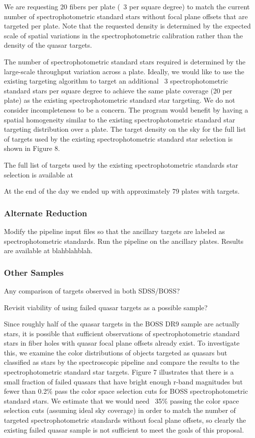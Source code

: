 \documentclass[preprint2]{aastex}
\begin{document}
We are requesting 20 fibers per plate (~3 per square degree) to match the current number of spectrophotometric standard stars without focal plane offsets that are targeted per plate. Note that the requested density is determined by the expected scale of spatial variations in the spectrophotometric calibration rather than the density of the quasar targets.

The number of spectrophotometric standard stars required is determined by the large-scale throughput variation across a plate. Ideally, we would like to use the existing targeting algorithm to target an additional ~3 spectrophotometric standard stars per square degree to achieve the same plate coverage (20 per plate) as the existing spectrophotometric standard star targeting. We do not consider incompleteness to be a concern. The program would benefit by having a spatial homogeneity similar to the existing spectrophotometric standard star targeting distribution over a plate. The target density on the sky for the full list of targets used by the existing spectrophotometric standard star selection is shown in Figure 8.

The full list of targets used by the existing spectrophotometric standards star selection is available at %

At the end of the day we ended up with approximately 79 plates with targets.

\subsubsection{Alternate Reduction}

Modify the pipeline input files so that the ancillary targets are labeled as spectrophotometric standards. Run the pipeline on the ancillary plates. Results are available at blahblahblah.

\subsubsection{Other Samples}

Any comparison of targets observed in both SDSS/BOSS?

Revisit viability of using failed quasar targets as a possible sample?

Since roughly half of the quasar targets in the BOSS DR9 sample are actually stars, it is possible that sufficient observations of spectrophotometric standard stars in fiber holes with quasar focal plane offsets already exist. To investigate this, we examine the color distributions of objects targeted as quasars but classified as stars by the spectroscopic pipeline and compare the results to the spectrophotometric standard star targets. Figure 7 illustrates that there is a small fraction of failed quasars that have bright enough r-band magnitudes but fewer than 0.2\% pass the color space selection cuts for BOSS spectrophotometric standard stars. We estimate that we would need ~35\% passing the color space selection cuts (assuming ideal sky coverage) in order to match the number of targeted spectrophotometric standards without focal plane offsets, so clearly the existing failed quasar sample is not sufficient to meet the goals of this proposal.
\end{document}
